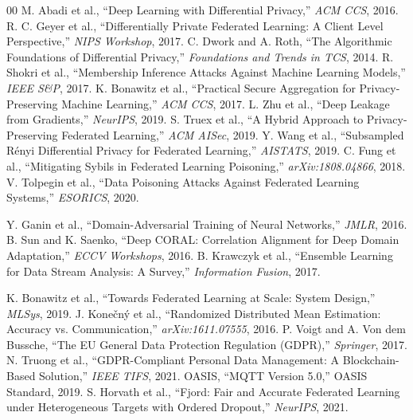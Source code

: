 \documentclass[conference]{IEEEtran}
\begin{document}
\begin{thebibliography}{00}
 M. Abadi et al., ``Deep Learning with Differential Privacy,'' \textit{ACM CCS}, 2016.
 R. C. Geyer et al., ``Differentially Private Federated Learning: A Client Level Perspective,'' \textit{NIPS Workshop}, 2017.
 C. Dwork and A. Roth, ``The Algorithmic Foundations of Differential Privacy,'' \textit{Foundations and Trends in TCS}, 2014.
 R. Shokri et al., ``Membership Inference Attacks Against Machine Learning Models,'' \textit{IEEE S\&P}, 2017.
 K. Bonawitz et al., ``Practical Secure Aggregation for Privacy-Preserving Machine Learning,'' \textit{ACM CCS}, 2017.
 L. Zhu et al., ``Deep Leakage from Gradients,'' \textit{NeurIPS}, 2019.
 S. Truex et al., ``A Hybrid Approach to Privacy-Preserving Federated Learning,'' \textit{ACM AISec}, 2019.
 Y. Wang et al., ``Subsampled R\'enyi Differential Privacy for Federated Learning,'' \textit{AISTATS}, 2019.
 C. Fung et al., ``Mitigating Sybils in Federated Learning Poisoning,'' \textit{arXiv:1808.04866}, 2018.
 V. Tolpegin et al., ``Data Poisoning Attacks Against Federated Learning Systems,'' \textit{ESORICS}, 2020.

 Y. Ganin et al., ``Domain-Adversarial Training of Neural Networks,'' \textit{JMLR}, 2016.
 B. Sun and K. Saenko, ``Deep CORAL: Correlation Alignment for Deep Domain Adaptation,'' \textit{ECCV Workshops}, 2016.
 B. Krawczyk et al., ``Ensemble Learning for Data Stream Analysis: A Survey,'' \textit{Information Fusion}, 2017.

 K. Bonawitz et al., ``Towards Federated Learning at Scale: System Design,'' \textit{MLSys}, 2019.
 J. Kone\v{c}n\'y et al., ``Randomized Distributed Mean Estimation: Accuracy vs. Communication,'' \textit{arXiv:1611.07555}, 2016.
 P. Voigt and A. Von dem Bussche, ``The EU General Data Protection Regulation (GDPR),'' \textit{Springer}, 2017.
 N. Truong et al., ``GDPR-Compliant Personal Data Management: A Blockchain-Based Solution,'' \textit{IEEE TIFS}, 2021.
 OASIS, ``MQTT Version 5.0,'' OASIS Standard, 2019.
 S. Horvath et al., ``Fjord: Fair and Accurate Federated Learning under Heterogeneous Targets with Ordered Dropout,'' \textit{NeurIPS}, 2021.


\end{thebibliography}
\end{document}
